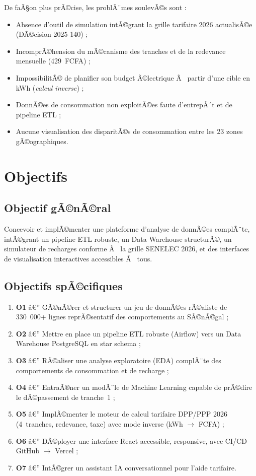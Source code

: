 \documentclass[12pt,a4paper]{report}
\begin{document}
De faÃ§on plus prÃ©cise, les problÃ¨mes soulevÃ©s sont :
\begin{itemize}
  \item Absence d'outil de simulation intÃ©grant la grille tarifaire 2026 actualisÃ©e (DÃ©cision 2025-140) ;
  \item IncomprÃ©hension du mÃ©canisme des tranches et de la redevance mensuelle (429~FCFA) ;
  \item ImpossibilitÃ© de planifier son budget Ã©lectrique Ã  partir d'une cible en kWh (\textit{calcul inverse}) ;
  \item DonnÃ©es de consommation non exploitÃ©es faute d'entrepÃ´t et de pipeline ETL ;
  \item Aucune visualisation des disparitÃ©s de consommation entre les 23 zones gÃ©ographiques.
\end{itemize}

\section{Objectifs}

\subsection*{Objectif gÃ©nÃ©ral}
Concevoir et implÃ©menter une plateforme d'analyse de donnÃ©es complÃ¨te, intÃ©grant un pipeline ETL robuste, un Data Warehouse structurÃ©, un simulateur de recharges conforme Ã  la grille SENELEC 2026, et des interfaces de visualisation interactives accessibles Ã  tous.

\subsection*{Objectifs spÃ©cifiques}
\begin{enumerate}
  \item \textbf{O1} â€” GÃ©nÃ©rer et structurer un jeu de donnÃ©es rÃ©aliste de 330~000+ lignes reprÃ©sentatif des comportements au SÃ©nÃ©gal ;
  \item \textbf{O2} â€” Mettre en place un pipeline ETL robuste (Airflow) vers un Data Warehouse PostgreSQL en star schema ;
  \item \textbf{O3} â€” RÃ©aliser une analyse exploratoire (EDA) complÃ¨te des comportements de consommation et de recharge ;
  \item \textbf{O4} â€” EntraÃ®ner un modÃ¨le de Machine Learning capable de prÃ©dire le dÃ©passement de tranche~1 ;
  \item \textbf{O5} â€” ImplÃ©menter le moteur de calcul tarifaire DPP/PPP 2026 (4~tranches, redevance, taxe) avec mode inverse (kWh $\rightarrow$ FCFA) ;
  \item \textbf{O6} â€” DÃ©ployer une interface React accessible, responsive, avec CI/CD GitHub $\rightarrow$ Vercel ;
  \item \textbf{O7} â€” IntÃ©grer un assistant IA conversationnel pour l'aide tarifaire.
\end{enumerate}
\end{document}
